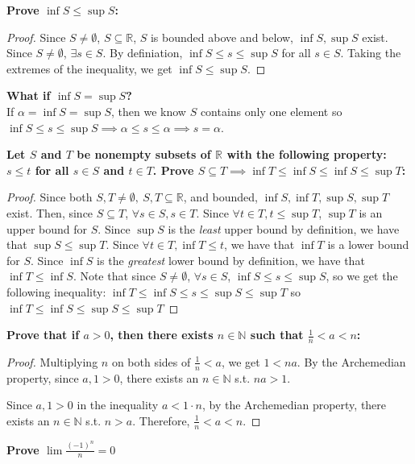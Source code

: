 \documentclass[13pt]{letter}
\begin{document}
\textbf{Prove $\inf{S} \leq \sup{S}$:}
\begin{proof}
  Since $S \neq \emptyset$, $S \subseteq
  \mathbb{R}$, $S$ is bounded above and below, $\inf{S}, \sup{S}$
  exist. Since $S \neq \emptyset$, $\exists s \in S$. By definiation,
  $\inf{S} \leq s \leq \sup{S}$ for all $s \in S$. Taking the extremes of the
  inequality, we get $\inf{S} \leq \sup{S}$.
\end{proof}
\textbf{What if $\inf{S} = \sup{S}$?} \\
If $\alpha = \inf{S} = \sup{S}$, then we know $S$ contains only one
element so $\inf{S} \leq s \leq \sup{S} \implies \alpha \leq s \leq
\alpha \implies s = \alpha$. 

\textbf{Let $S$ and $T$ be nonempty subsets of $\mathbb{R}$ with the
  following property: $s \leq t$ for all $s \in S$ and $t \in
  T$. Prove $S \subseteq T \implies \inf{T} \leq \inf{S} \leq \inf{S} \leq \sup{T}$:}
\begin{proof}
  Since both $S, T \neq \emptyset, \ S, T \subseteq \mathbb{R}$, and
  bounded, $\inf{S}, \inf{T}, \sup{S}, \sup{T}$ exist. Then, since $S
  \subseteq T$, $\forall s \in S, s \in T$. Since $\forall t \in T, t
  \leq \sup{T}$, $\sup{T}$ is an upper bound for $S$. Since $\sup{S}$
  is the \textit{least} upper bound by definition, we have that
  $\sup{S} \leq \sup{T}$. Since $\forall t \in T, \inf{T} \leq t$, we
  have that $\inf{T}$ is a lower bound for $S$. Since $\inf{S}$ is the
  \textit{greatest} lower bound by definition, we have that $\inf{T}
  \leq \inf{S}$. Note that since $S \neq \emptyset$, $\forall s \in
  S$, $\inf{S} \leq s \leq \sup{S}$, so we get the following
  inequality: $\inf{T} \leq \inf{S} \leq s \leq \sup{S} \leq \sup{T}$
  so $\inf{T} \leq \inf{S} \leq \sup{S} \leq \sup{T}$
\end{proof}

\textbf{Prove that if $a > 0$, then there exists $n \in \mathbb{N}$
  such that $\frac{1}{n} < a < n$:}
\begin{proof}
  Multiplying $n$ on both sides of $\frac{1}{n} < a$, we get $1 <
  na$. By the Archemedian property, since $a, 1 > 0$, there exists
  an $n \in \mathbb{N}$ s.t. $na > 1$.

  Since $a, 1 > 0$ in the inequality  $a < 1 \cdot n$, by the
  Archemedian property, there exists an $n \in \mathbb{N}$ s.t. $n >
  a$. Therefore, $\frac{1}{n} < a < n$.
\end{proof}

\textbf{Prove $\lim \frac{(-1)^n}{n} = 0$}
\end{document}
